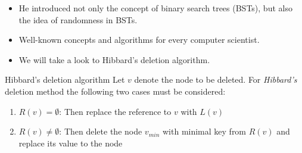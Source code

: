 \documentclass{beamer}
\begin{document}
\begin{frame}
    \begin{itemize}
        \item He introduced not only the concept of binary search trees (BSTs), but also the idea of randomness in BSTs.
            \pause
        \item Well-known concepts and algorithms for every computer scientist.
            \pause
        \item We will take a look to Hibbard's deletion algorithm.
    \end{itemize}

    \begin{block}{Hibbard's deletion algorithm}
        Let $v$ denote the node to be deleted. For \textit{Hibbard's} deletion method the following two cases must be considered:
        \begin{enumerate}
            \item $R(v) = \emptyset$: Then replace the reference to $v$ with $L(v)$
            \item $R(v) \neq \emptyset$: Then delete the node $v_{min}$ with minimal key from $R(v)$ and replace its value to the node
        \end{enumerate}
    \end{block}
\end{frame}
\end{document}
